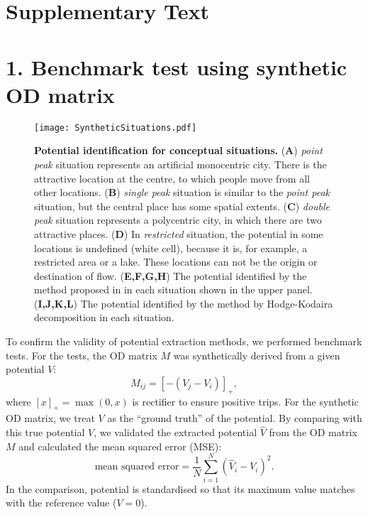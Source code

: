 \documentclass[]{article}
\begin{document}
%
\clearpage
\setcounter{figure}{0} 
\setcounter{table}{0} 
\renewcommand{\thefigure}{S\arabic{figure}}
\renewcommand{\thetable}{S\arabic{table}}

\section*{Supplementary Text}
\section*{1. Benchmark test using synthetic OD matrix}

%
%
%
%
%
%
%
%
%
%
%
%
%
%
%
%

\begin{figure}[tb]
  \texttt{[image: SyntheticSituations.pdf]}
  \caption{
    \textbf{Potential identification for conceptual situations.}
    (\textbf{A}) 
  \textit{point peak} situation represents an artificial monocentric city.
There is the attractive location at the centre, to which people move from all other locations.
    (\textbf{B}) 
\textit{single peak} situation is similar to the \textit{point peak} situation, but the central place has some spatial extents.
    (\textbf{C}) 
\textit{double peak} situation represents a polycentric city, in which there are two attractive places.
    (\textbf{D}) 
    In \textit{restricted} situation, the potential in some locations is undefined (white cell), because it is, for example, a restricted area or a lake.
These locations can not be the origin or destination of flow.
    (\textbf{E,F,G,H}) 
    The potential identified by the method proposed in \cite{Mazzoli2019b} in each situation shown in the upper panel.
    (\textbf{I,J,K,L}) 
    The potential identified by the method by Hodge-Kodaira decomposition in each situation.
  }
  \label{fig:synthetic}
\end{figure}

To confirm the validity of potential extraction methods, we performed benchmark tests.
For the tests, the OD matrix $M$ was synthetically derived from a given potential $V$:
\begin{equation}
  M_{ij} = [ - (V_j - V_i) ]_{+}, \label{eq:synthetic_gradient}
\end{equation}
where $[x]_+ = \max(0,x)$ is rectifier to ensure positive trips.
For the synthetic OD matrix, we treat $V$ as the ``ground truth'' of the potential. %
By comparing with this true potential $V$,
we validated the extracted potential $\hat{V}$ from the OD matrix $M$
and calculated the mean squared error (MSE):
\begin{equation}
  \text{mean squared error} = \frac{1}{N} \sum_{i = 1}^N   (\hat{V}_i - V_i)^2. \label{eq:MSE}
\end{equation}
In the comparison, potential is standardised so that its maximum value matches with the reference value ($V=0$).
\end{document}
